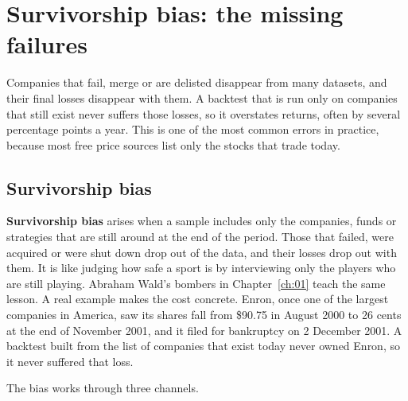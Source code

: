\section{Survivorship bias: the missing failures}
\label{sec:02-survivorship}

Companies that fail, merge or are delisted disappear from many datasets, and their final losses disappear with them. A backtest that is run only on companies that still exist never suffers those losses, so it overstates returns, often by several percentage points a year. This is one of the most common errors in practice, because most free price sources list only the stocks that trade today.

\subsection{Survivorship bias}

\textbf{Survivorship bias} arises when a sample includes only the companies, funds or strategies that are still around at the end of the period. Those that failed, were acquired or were shut down drop out of the data, and their losses drop out with them. It is like judging how safe a sport is by interviewing only the players who are still playing. Abraham Wald's bombers in Chapter~\ref{ch:01} teach the same lesson. A real example makes the cost concrete. Enron, once one of the largest companies in America, saw its shares fall from \$90.75 in August 2000 to 26 cents at the end of November 2001, and it filed for bankruptcy on 2 December 2001. A backtest built from the list of companies that exist today never owned Enron, so it never suffered that loss.

The bias works through three channels.

